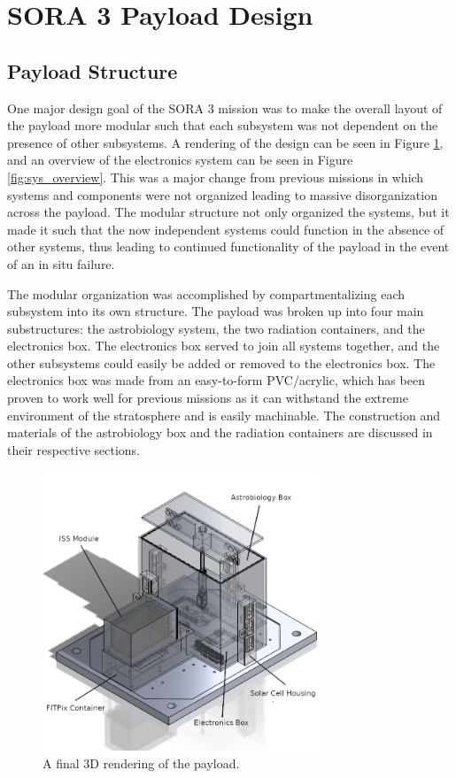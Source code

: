 \section{SORA 3 Payload Design}
\label{sec:Design}

\subsection{Payload Structure}
One major design goal of the SORA 3 mission was to make the overall layout of the payload more modular such that each subsystem was not dependent on the presence of other subsystems.
A rendering of the design can be seen in Figure \ref{fig:payload-rendering}, and an overview of the electronics system can be seen in Figure \ref{fig:sys_overview}.
This was a major change from previous missions in which systems and components were not organized leading to massive disorganization across the payload.
The modular structure not only organized the systems, but it made it such that the now independent systems could function in the absence of other systems, thus leading to continued functionality of the payload in the event of an in situ failure.

The modular organization was accomplished by compartmentalizing each subsystem into its own structure.
The payload was broken up into four main substructures: the astrobiology system, the two radiation containers, and the electronics box.
The electronics box served to join all systems together, and the other subsystems could easily be added or removed to the electronics box.
The electronics box was made from an easy-to-form PVC/acrylic, which has been proven to work well for previous missions as it can withstand the extreme environment of the stratosphere and is easily machinable.
The construction and materials of the astrobiology box and the radiation containers are discussed in their respective sections.

\begin{figure}[h!]
	\begin{center}
		\includegraphics[width=0.75\textwidth]{figures/payload-transparent-labelled.png}
		\caption{A final 3D rendering of the payload.}
		\label{fig:payload-rendering}
	\end{center}
\end{figure}

